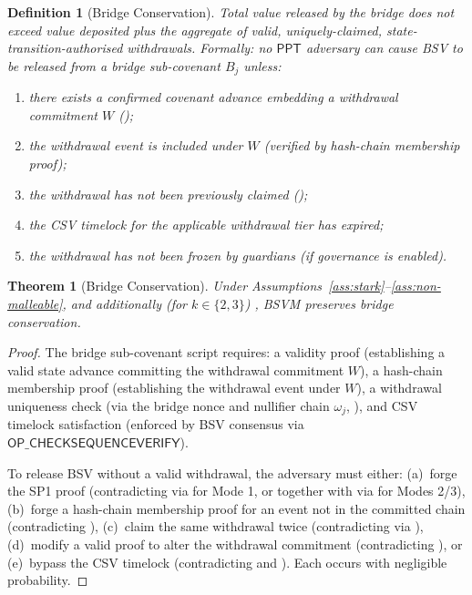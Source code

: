 \documentclass[11pt,a4paper]{article}
\newtheorem{definition}{Definition}[section]
\newtheorem{theorem}{Theorem}[section]
\newcommand{\PPT}{\mathsf{PPT}}
\begin{document}
\begin{definition}[Bridge Conservation]\label{def:bridge-cons}
Total value released by the bridge does not exceed value deposited plus the aggregate of valid, uniquely-claimed, state-transition-authorised withdrawals. Formally: no $\PPT$ adversary can cause BSV to be released from a bridge sub-covenant $B_j$ unless:
\begin{enumerate}[nosep,label=(\roman*)]
    \item there exists a confirmed covenant advance embedding a withdrawal commitment $W$ ();
    \item the withdrawal event is included under $W$ (verified by hash-chain membership proof);
    \item the withdrawal has not been previously claimed ();
    \item the CSV timelock for the applicable withdrawal tier has expired;
    \item the withdrawal has not been frozen by guardians (if governance is enabled).
\end{enumerate}
\end{definition}

\begin{theorem}[Bridge Conservation]\label{thm:bridge-cons}
Under Assumptions~\ref{ass:stark}--\ref{ass:non-malleable}, and additionally (for $k \in \{2, 3\}$) , BSVM preserves bridge conservation.
\end{theorem}

\begin{proof}
The bridge sub-covenant script requires: a validity proof (establishing a valid state advance committing the withdrawal commitment $W$), a hash-chain membership proof (establishing the withdrawal event under $W$), a withdrawal uniqueness check (via the bridge nonce and nullifier chain $\omega_j$, ), and CSV timelock satisfaction (enforced by BSV consensus via $\mathsf{OP\_CHECKSEQUENCEVERIFY}$).

To release BSV without a valid withdrawal, the adversary must either: (a)~forge the SP1 proof (contradicting  via  for Mode 1, or  together with  via  for Modes 2/3), (b)~forge a hash-chain membership proof for an event not in the committed chain (contradicting ), (c)~claim the same withdrawal twice (contradicting  via ), (d)~modify a valid proof to alter the withdrawal commitment (contradicting ), or (e)~bypass the CSV timelock (contradicting  and ). Each occurs with negligible probability. \qedhere
\end{proof}
\end{document}
